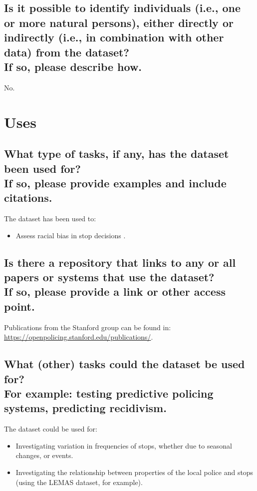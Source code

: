 \documentclass[letterpaper, 10 pt, conference]{ieeeconf}  %
\newcommand{\subtitle}[1]{{\\ \small \normalfont \color{purple} #1}}
\begin{document}
\subsection{Is it possible to identify individuals (i.e., one or more natural persons), either directly or indirectly (i.e., in combination with other data) from the dataset? \subtitle{If so, please describe how.}}

No.

\section{Uses}

\subsection{What type of tasks, if any, has the dataset been used for? \subtitle{If so, please provide examples and include citations.}}

The dataset has been used to:

\begin{itemize}
    \item Assess racial bias in stop decisions \cite{pierson2020large, ekstrom2022racial}.
\end{itemize}

\subsection{Is there a repository that links to any or all papers or systems that use the dataset? \subtitle{If so, please provide a link or other access point. }}

Publications from the Stanford group can be found in: \\ \href{https://openpolicing.stanford.edu/publications/}{https://openpolicing.stanford.edu/publications/}.

\subsection{What (other) tasks could the dataset be used for? \subtitle{For example: testing predictive policing systems, predicting recidivism.}}

The dataset could be used for:

\begin{itemize}
    \item Investigating variation in frequencies of stops, whether due to seasonal changes, or events.
    \item Investigating the relationship between properties of the local police and stops (using the LEMAS dataset, for example).
\end{itemize}
\end{document}
